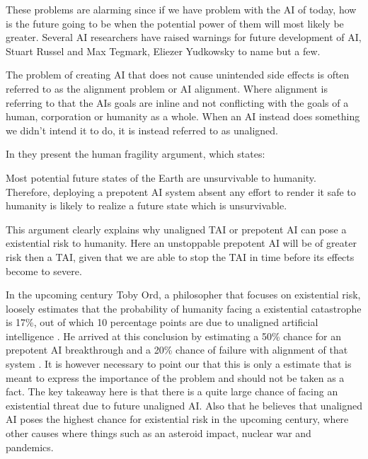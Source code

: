 \documentclass[12pt,A4]{report}
\theoremstyle{definition}
\begin{document}
These problems are alarming since if we have problem with the AI of today, how is the future going to be when the potential power of them will most likely be greater. Several AI researchers have raised warnings for future development of AI, Stuart Russel and Max Tegmark, Eliezer Yudkowsky to name but a few.

The problem of creating AI that does not cause unintended side effects is often referred to as the alignment problem or AI alignment. Where alignment is referring to that the AIs goals are inline and not conflicting with the goals of a human, corporation or humanity as a whole. When an AI instead does something we didn't intend it to do, it is instead referred to as unaligned.


In \autocite{Critch Kruger} they present the human fragility argument, which states: 
\begin{displayquote}
  Most potential future states of the Earth are unsurvivable to humanity. Therefore, deploying a prepotent AI system absent any effort to render it safe to humanity is likely to realize a future state which is unsurvivable. %
\end{displayquote}
This argument clearly explains why unaligned TAI or prepotent AI can pose a existential risk to humanity. Here an unstoppable prepotent AI will be of greater risk then a TAI, given that we are able to stop the TAI in time before its effects become to severe.

In the upcoming century Toby Ord, a philosopher that focuses on existential risk, loosely estimates that the probability of humanity facing a existential catastrophe is 17\%, out of which 10 percentage points are due to unaligned artificial intelligence \autocite{precipice}. He arrived at this conclusion by estimating a 50\% chance for an prepotent AI breakthrough and a 20\% chance of failure with alignment of that system \autocite{rationally speaking}. It is however necessary to point our that this is only a estimate that is meant to express the importance of the problem and should not be taken as a fact. The key takeaway here is that there is a quite large chance of facing an existential threat due to future unaligned AI. Also that he believes that unaligned AI poses the highest chance for existential risk in the upcoming century, where other causes where things such as an asteroid impact, nuclear war and pandemics. 
\end{document}
